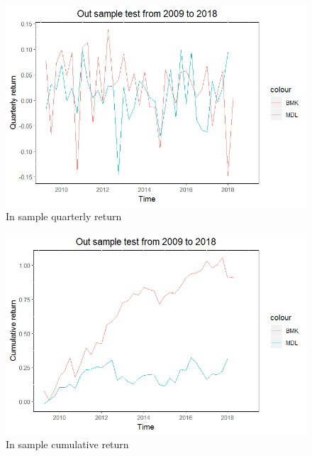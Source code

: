 \documentclass[]{article}
\begin{document}
\begin{figure}[H]
\begin{center}
\includegraphics[width=5in]{Lab//Out_sample_qtrly_return.jpg}
\caption{In sample quarterly return}
\label{figure11}
\end{center}
\end{figure}

\begin{figure}[H]
\begin{center}
\includegraphics[width=5in]{Lab//Out_sample_cumu_return.jpg}
\caption{In sample cumulative return}
\label{figure12}
\end{center}
\end{figure}
\end{document}
